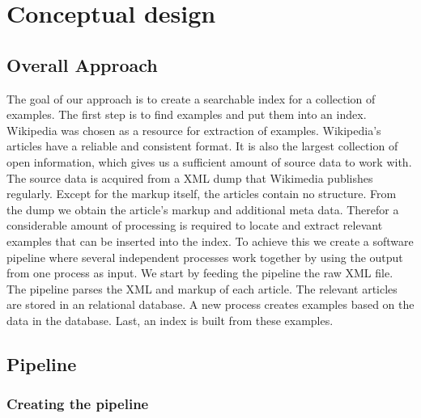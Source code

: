 
\chapter{Conceptual design}\label{cap_3}



\section{Overall Approach}

The goal of our approach is to create a searchable index for a collection of examples. The first step is to find examples and put them into an index. Wikipedia was chosen as a resource for extraction of examples. Wikipedia's articles have a reliable and consistent format. It is also the largest collection of open information, which gives us a sufficient amount of source data to work with. The source data is acquired from a XML dump that Wikimedia publishes regularly. Except for the markup itself, the articles contain no structure. From the dump we obtain the article's markup and additional meta data. Therefor a considerable amount of processing is required to locate and extract relevant examples that can be inserted into the index. To achieve this we create a software pipeline where several independent processes work together by using the output from one process as input. We start by feeding the pipeline the raw XML file. The pipeline parses the XML and markup of each article. The relevant articles are stored in an relational database. A new process creates examples based on the data in the database. Last, an index is built from these examples.

\section{Pipeline} \label{cd_pipeline}

\subsection{Creating the pipeline} \label{custom-pipeline}


